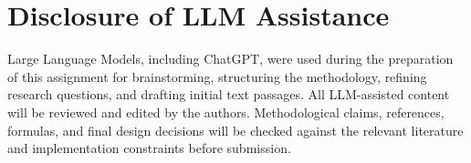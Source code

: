 \documentclass[sigconf]{acmart}
\begin{document}
\section{Disclosure of LLM Assistance}
Large Language Models, including ChatGPT, were used during the preparation of this assignment for brainstorming, structuring the methodology, refining research questions, and drafting initial text passages. All LLM-assisted content will be reviewed and edited by the authors. Methodological claims, references, formulas, and final design decisions will be checked against the relevant literature and implementation constraints before submission.



\end{document}
